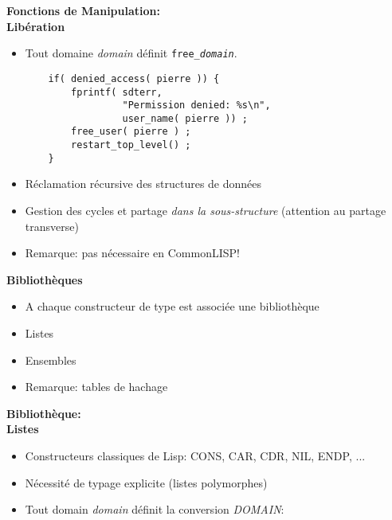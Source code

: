 \documentclass[11pt]{article}
\begin{document}
{\begin{center}
{\huge\bf Fonctions de Manipulation: \\
Libération}
\end{center}

\vskip 2cm

\begin{itemize}
\item Tout domaine {\em domain} définit {\tt free\_{\em domain}}.

\begin{verbatim}
    if( denied_access( pierre )) {
        fprintf( sdterr, 
                 "Permission denied: %s\n", 
                 user_name( pierre )) ;
        free_user( pierre ) ;
        restart_top_level() ;
    }
\end{verbatim}
\item Réclamation récursive des structures de données
\item Gestion des cycles et partage {\em dans la sous-structure}
(attention au partage transverse)
\item Remarque: pas nécessaire en CommonLISP!
\end{itemize}

\newpage

\begin{center}
{\huge\bf Bibliothèques}
\end{center}

\vskip 2cm

\begin{itemize}
\item A chaque constructeur de type est associée une bibliothèque
\item Listes
\item Ensembles
\item Remarque: tables de hachage
\end{itemize}

\newpage

\begin{center}
{\huge\bf Bibliothèque: \\
Listes}
\end{center}

\vskip 2cm

\begin{itemize}
\item Constructeurs classiques de Lisp: CONS, CAR, CDR, NIL, ENDP, ...
\item Nécessité de typage explicite (listes polymorphes)
\item Tout domain {\em domain} définit la conversion {\em DOMAIN}:


\end{itemize}}
\end{document}
